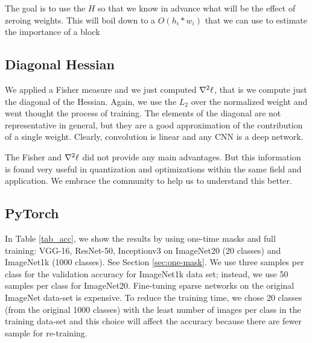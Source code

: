 \documentclass[conference]{IEEEtran}
\begin{document}
The goal is to use the $H$ so that we know in advance what will be the
effect of zeroing weights. This will boil down to a $O(h_i*w_i)$ that
we can use to estimate the importance of a block

\subsection{Diagonal Hessian}
We applied a Fisher measure and we just computed $\nabla^2{\bf \ell}$,
that is we compute just the diagonal of the Hessian. Again, we use the
$L_2$ over the normalized weight and went thought the process of
training. The elements of the diagonal are not representative in
general, but they are a good approximation of the contribution of a
single weight. Clearly, convolution is linear and any CNN is a deep
network.

The Fisher and $\nabla^2{\bf \ell}$ did not provide any main
advantages. But this information is found very useful in quantization
and optimizations within the same field and application. We embrace the
community to help us to understand this better. 

\subsection{PyTorch} 
\label{sec:pytorch}


In Table \ref{tab_acc}, we show the results by using one-time masks
and full training: VGG-16, ResNet-50, Inceptionv3 on ImageNet20 (20
classes) and ImageNet1k (1000 classes). See Section
\ref{sec:one-mask}. We use three samples per class for the validation
accuracy for ImageNet1k data set; instead, we use 50 samples per class
for ImageNet20. Fine-tuning sparse networks on the original ImageNet
data-set \cite{deng2009imagenet} is expensive. To reduce the training
time, we chose 20 classes (from the original 1000 classes) with the
least number of images per class in the training data-set and this
choice will affect the accuracy because there are fewer sample for
re-training.
\end{document}
